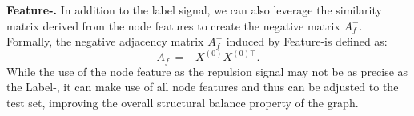 \textbf{Feature-\ours.} 
In addition to the label signal, we can also  leverage the similarity matrix derived from the node features to create the negative matrix $A^-_f$. 
Formally, the negative adjacency matrix $A^-_f$ induced by Feature-\ours is defined as: 
\begin{equation}
    A^-_f = - X^{(0)} X^{(0)\top}.
\end{equation}
While the use of the node feature as the repulsion signal may not be as precise as the Label-\ours,  it can make use of all node features and thus can be adjusted to the test set, improving the overall structural balance property of the graph. 

